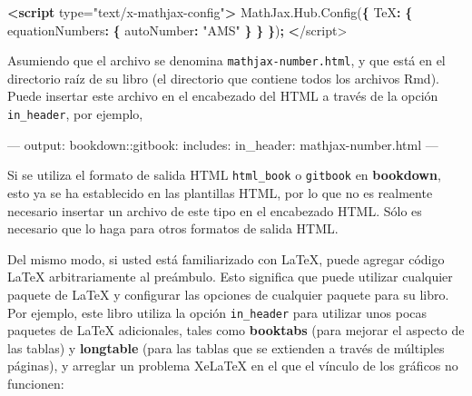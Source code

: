 \documentclass[12pt,]{krantz}
\makeatletter
\newenvironment{Shaded}{\begin{snugshade}}{\end{snugshade}}
\newcommand{\KeywordTok}[1]{\textcolor[rgb]{0.13,0.29,0.53}{\textbf{{#1}}}}
\newcommand{\DataTypeTok}[1]{\textcolor[rgb]{0.13,0.29,0.53}{{#1}}}
\newcommand{\StringTok}[1]{\textcolor[rgb]{0.31,0.60,0.02}{{#1}}}
\newcommand{\SpecialStringTok}[1]{\textcolor[rgb]{0.31,0.60,0.02}{{#1}}}
\newcommand{\OtherTok}[1]{\textcolor[rgb]{0.56,0.35,0.01}{{#1}}}
\newcommand{\FunctionTok}[1]{\textcolor[rgb]{0.00,0.00,0.00}{{#1}}}
\newcommand{\VariableTok}[1]{\textcolor[rgb]{0.00,0.00,0.00}{{#1}}}
\newcommand{\OperatorTok}[1]{\textcolor[rgb]{0.81,0.36,0.00}{\textbf{{#1}}}}
\newcommand{\AttributeTok}[1]{\textcolor[rgb]{0.77,0.63,0.00}{{#1}}}
\newcommand{\NormalTok}[1]{{#1}}
\newenvironment{kframe}{%
\medskip{}
\setlength{\fboxsep}{.8em}
 \def\at@end@of@kframe{}%
 \ifinner\ifhmode%
  \def\at@end@of@kframe{\end{minipage}}%
  \begin{minipage}{\columnwidth}%
 \fi\fi%
 \def\FrameCommand##1{\hskip\@totalleftmargin \hskip-\fboxsep
 \colorbox{shadecolor}{##1}\hskip-\fboxsep
     \hskip-\linewidth \hskip-\@totalleftmargin \hskip\columnwidth}%
 \MakeFramed {\advance\hsize-\width
   \@totalleftmargin\z@ \linewidth\hsize
   \@setminipage}}%
 {\par\unskip\endMakeFramed%
 \at@end@of@kframe}
\renewenvironment{Shaded}{\begin{kframe}}{\end{kframe}}
\theoremstyle{definition}
\theoremstyle{definition}
\theoremstyle{remark}
\makeatother
\begin{document}
\begin{Shaded}
\begin{Highlighting}[]
\KeywordTok{<script}\OtherTok{ type=}\StringTok{"text/x-mathjax-config"}\KeywordTok{>}
\VariableTok{MathJax}\NormalTok{.}\VariableTok{Hub}\NormalTok{.}\AttributeTok{Config}\NormalTok{(}\OperatorTok{\{}
  \DataTypeTok{TeX}\OperatorTok{:} \OperatorTok{\{} \DataTypeTok{equationNumbers}\OperatorTok{:} \OperatorTok{\{} \DataTypeTok{autoNumber}\OperatorTok{:} \StringTok{"AMS"} \OperatorTok{\}} \OperatorTok{\}}
\OperatorTok{\}}\NormalTok{)}\OperatorTok{;}
\OperatorTok{<}\SpecialStringTok{/script>}
\end{Highlighting}
\end{Shaded}

Asumiendo que el archivo se denomina \texttt{mathjax-number.html}, y que
está en el directorio raíz de su libro (el directorio que contiene todos
los archivos Rmd). Puede insertar este archivo en el encabezado del HTML
a través de la opción \texttt{in\_header}, por ejemplo,

\begin{Shaded}
\begin{Highlighting}[]
\OtherTok{---}
\FunctionTok{output:}
  \FunctionTok{bookdown:}\NormalTok{:gitbook:}
    \FunctionTok{includes:}
      \FunctionTok{in_header:} \NormalTok{mathjax-number.html}
\OtherTok{---}
\end{Highlighting}
\end{Shaded}

Si se utiliza el formato de salida HTML \texttt{html\_book} o
\texttt{gitbook} en \textbf{bookdown}, esto ya se ha establecido en las
plantillas HTML, por lo que no es realmente necesario insertar un
archivo de este tipo en el encabezado HTML. Sólo es necesario que lo
haga para otros formatos de salida HTML.

Del mismo modo, si usted está familiarizado con LaTeX, puede agregar
código LaTeX arbitrariamente al preámbulo. Esto significa que puede
utilizar cualquier paquete de LaTeX y configurar las opciones de
cualquier paquete para su libro. Por ejemplo, este libro utiliza la
opción \texttt{in\_header} para utilizar unos pocas paquetes de LaTeX
adicionales, tales como \textbf{booktabs} (para mejorar el aspecto de
las tablas) y \textbf{longtable} (para las tablas que se extienden a
través de múltiples páginas), y arreglar un problema XeLaTeX en el que
el vínculo de los gráficos no funcionen:
\end{document}
